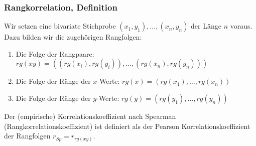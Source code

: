 \subsubsection{Rangkorrelation, Definition}
\label{sec:desk_statistik_rangkorrelation_zwei_merkmale}
Wir setzen eine bivariate Stichprobe $(x_1, y_1), \dots, (x_n, y_n)$ der Länge $n$ voraus. \\
Dazu bilden wir die zugehörigen Rangfolgen:
\begin{enumerate}
    \item Die Folge der Rangpaare: $rg(xy) = ((rg(x_i), rg(y_i)), \dots, (rg(x_n), rg(y_n)))$
    \item Die Folge der Ränge der $x$-Werte: $rg(x) = (rg(x_1), \dots, rg(x_n))$
    \item Die Folge der Ränge der $y$-Werte: $rg(y) = (rg(y_1), \dots, rg(y_n))$
\end{enumerate}
Der (empirische) Korrelationskoeffizient nach Spearman (Rangkorrelationskoeffizient) 
ist definiert als der Pearson Korrelationskoeffizient der Rangfolgen $r_{Sp} = r_{rg(xy)}$.

